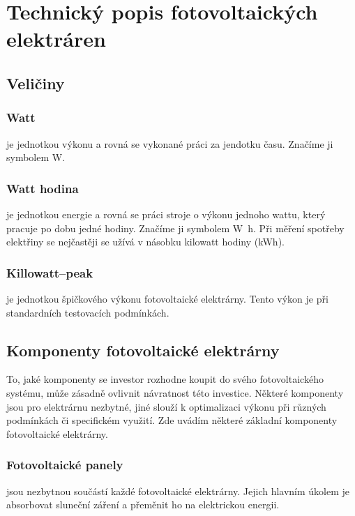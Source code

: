 \section{Technický popis fotovoltaických elektráren}



\subsection{Veličiny}

\subsubsection{Watt} je jednotkou výkonu a rovná se vykonané práci za jendotku času.
Značíme ji symbolem \si{\watt}.

\subsubsection{Watt hodina} je jednotkou energie a rovná se práci stroje o výkonu jednoho wattu, který pracuje po dobu jedné hodiny.
Značíme ji symbolem \si{\watt\hour}. Při měření spotřeby elektřiny se nejčastěji se užívá v násobku kilowatt hodiny (\si{\kWh}).

\subsubsection{Killowatt--peak} je jednotkou špičkového výkonu fotovoltaické elektrárny. Tento výkon je při standardních testovacích podmínkách.


\subsection{Komponenty fotovoltaické elektrárny}
To, jaké komponenty se investor rozhodne koupit do svého fotovoltaického systému, může zásadně ovlivnit návratnost této investice.
Některé komponenty jsou pro elektrárnu nezbytné, jiné slouží k optimalizaci výkonu při různých podmínkách či specifickém využití.
Zde uvádím některé základní komponenty fotovoltaické elektrárny.

\subsubsection{Fotovoltaické panely}

jsou nezbytnou součástí každé fotovoltaické elektrárny.
Jejich hlavním úkolem je absorbovat sluneční záření a přeměnit ho na elektrickou energii.

